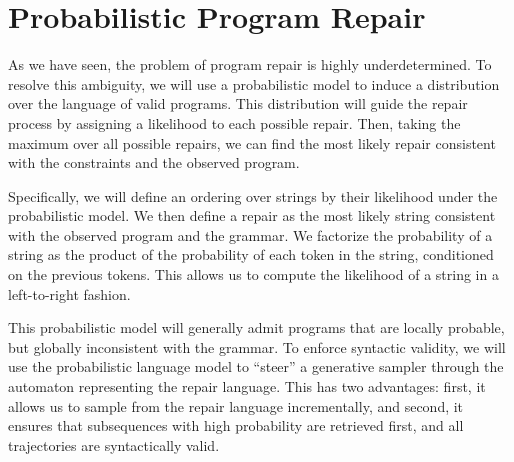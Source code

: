 \chapter{\rm\bfseries Probabilistic Program Repair}
\label{ch:chapter03}

As we have seen, the problem of program repair is highly underdetermined. To resolve this ambiguity, we will use a probabilistic model to induce a distribution over the language of valid programs. This distribution will guide the repair process by assigning a likelihood to each possible repair. Then, taking the maximum over all possible repairs, we can find the most likely repair consistent with the constraints and the observed program.

Specifically, we will define an ordering over strings by their likelihood under the probabilistic model. We then define a repair as the most likely string consistent with the observed program and the grammar. We factorize the probability of a string as the product of the probability of each token in the string, conditioned on the previous tokens. This allows us to compute the likelihood of a string in a left-to-right fashion.

This probabilistic model will generally admit programs that are locally probable, but globally inconsistent with the grammar. To enforce syntactic validity, we will use the probabilistic language model to ``steer'' a generative sampler through the automaton representing the repair language. This has two advantages: first, it allows us to sample from the repair language incrementally, and second, it ensures that subsequences with high probability are retrieved first, and all trajectories are syntactically valid.